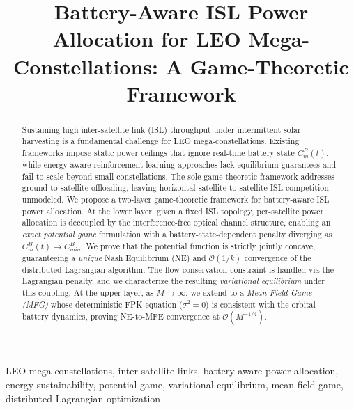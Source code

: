 \documentclass[journal]{IEEEtran}
\newcommand{\CB}{C^{B}}
\newcommand{\CBmin}{C^{B}_{min}}
\begin{document}
\title{Battery-Aware ISL Power Allocation for LEO
Mega-Constellations: A Game-Theoretic Framework}

\author{
}

\maketitle

\begin{abstract}
Sustaining high inter-satellite link (ISL) throughput under intermittent solar harvesting is a fundamental challenge for LEO mega-constellations. Existing frameworks impose static power ceilings that ignore real-time battery state $\CB_m(t)$, while energy-aware reinforcement learning approaches lack equilibrium guarantees and fail to scale beyond small constellations. The sole game-theoretic framework addresses ground-to-satellite offloading, leaving horizontal satellite-to-satellite ISL competition unmodeled. We propose a two-layer game-theoretic framework for battery-aware ISL power allocation. At the lower layer, given a fixed ISL topology, per-satellite power allocation is decoupled by the interference-free optical channel structure, enabling an \emph{exact potential game} formulation with a battery-state-dependent penalty diverging as $\CB_m(t)\to\CBmin$. We prove that the potential function is strictly jointly concave, guaranteeing a \emph{unique} Nash Equilibrium (NE) and $\mathcal{O}(1/k)$ convergence of the distributed Lagrangian algorithm. The flow conservation constraint is handled via the Lagrangian penalty, and we characterize the resulting \emph{variational equilibrium} under this coupling. At the upper layer, as $M\to\infty$, we extend to a \emph{Mean Field Game (MFG)} whose deterministic FPK equation ($\sigma^2=0$) is consistent with the orbital battery dynamics, proving NE-to-MFE convergence at $\mathcal{O}(M^{-1/4})$. 
\end{abstract}

\begin{IEEEkeywords}
LEO mega-constellations, inter-satellite links, battery-aware power allocation, energy sustainability, potential game, variational equilibrium, mean field game, distributed Lagrangian optimization
\end{IEEEkeywords}
\end{document}
